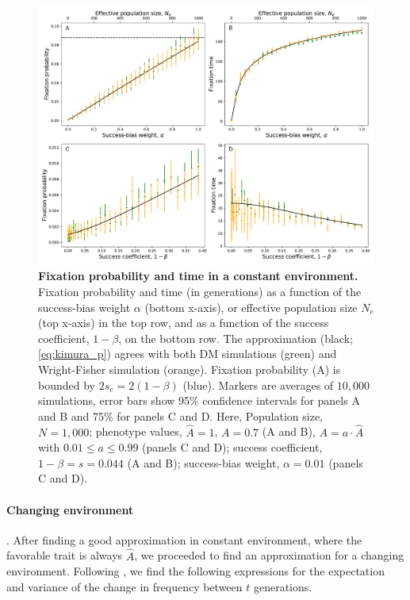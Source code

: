 \documentclass[12pt]{extarticle}
\begin{document}
\begin{figure}[h]
    \includegraphics[width=\linewidth]{../figures/final/kimura_var.pdf}
  \caption{\textbf{Fixation probability and time in a constant environment.}
  Fixation probability and time (in generations) as a function of the success-bias weight $\alpha$ (bottom x-axis), or effective population size $N_e$ (top x-axis) in the top row, and as a function of the success coefficient, $1-\beta$, on the bottom row.
  The approximation (black; \cref{eq:kimura_p}) agrees with both DM simulations (green) and Wright-Fisher simulation (orange).
  Fixation probability (A) is bounded by $2s_e=2(1-\beta)$ (blue).
  Markers are averages of $10,000$ simulations, error bars show 95\% confidence intervals for panels A and B and 75\% for panels C and D.
   Here, Population size, $N=1,000$; phenotype values, $\hat{A}=1$, $A=0.7$ (A and B), $A = a \cdot \hat{A}$ with $0.01 \le a \le 0.99$ (panels C and D); success coefficient, $1-\beta=s=0.044$ (A and B); success-bias weight, $\alpha=0.01$ (panels C and D).}
  \label{fig:var_alpha}
\end{figure}


\paragraph*{Changing environment}. After finding a good approximation in constant environment, where the favorable trait is always $\hat{A}$, we proceeded to find an approximation for a changing environment. 
Following \citet{changeEnv}, we find the following expressions for the expectation and variance of the change in frequency between $t$ generations.\\
\end{document}
